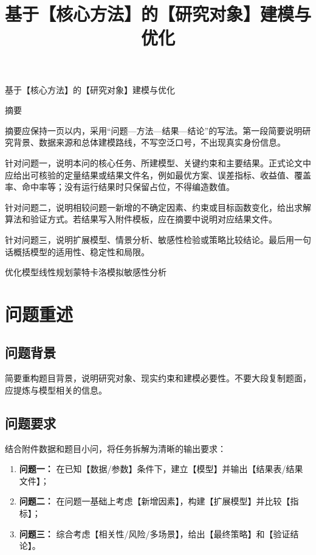 \documentclass[UTF8,a4paper,zihao=-4]{ctexart}
\title{基于【核心方法】的【研究对象】建模与优化}
\author{}
\date{}
\begin{document}
\setcounter{page}{1}
\thispagestyle{fancy}
\begin{center}
  {\heiti{} 基于【核心方法】的【研究对象】建模与优化\par}
  \vspace{2em}
  {\heiti{} 摘要\par}
\end{center}
\vspace{1em}
\setlength{\parindent}{2em}
摘要应保持一页以内，采用“问题—方法—结果—结论”的写法。第一段简要说明研究背景、数据来源和总体建模路线，不写空泛口号，不出现真实身份信息。

针对问题一，说明本问的核心任务、所建模型、关键约束和主要结果。正式论文中应给出可核验的定量结果或结果文件名，例如最优方案、误差指标、收益值、覆盖率、命中率等；没有运行结果时只保留占位，不得编造数值。

针对问题二，说明相较问题一新增的不确定因素、约束或目标函数变化，给出求解算法和验证方式。若结果写入附件模板，应在摘要中说明对应结果文件。

针对问题三，说明扩展模型、情景分析、敏感性检验或策略比较结论。最后用一句话概括模型的适用性、稳定性和局限。

\vspace{1em}
优化模型\quad 线性规划\quad 蒙特卡洛模拟\quad 敏感性分析

\newpage


\section{问题重述}
\subsection{问题背景}
简要重构题目背景，说明研究对象、现实约束和建模必要性。不要大段复制题面，应提炼与模型相关的信息。

\subsection{问题要求}
结合附件数据和题目小问，将任务拆解为清晰的输出要求：
\begin{enumerate}
  \item \textbf{问题一：} 在已知【数据/参数】条件下，建立【模型】并输出【结果表/结果文件】；
  \item \textbf{问题二：} 在问题一基础上考虑【新增因素】，构建【扩展模型】并比较【指标】；
  \item \textbf{问题三：} 综合考虑【相关性/风险/多场景】，给出【最终策略】和【验证结论】。
\end{enumerate}
\end{document}
